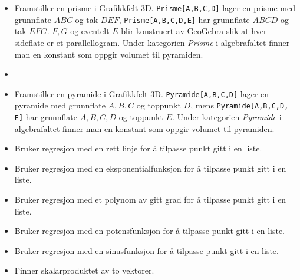 \begin{itemize}
\item {}
{Framstiller en prisme i Grafikkfelt 3D. {\tt Prisme[A,B,C,D]} lager en prisme med grunnflate $ ABC $ og tak $ DEF $, {\tt Prisme[A,B,C,D,E]} har grunnflate $ ABCD $ og tak $ EFG $. $ F, G$ og eventelt $ E $ blir konstruert av GeoGebra slik at hver sideflate er et parallellogram. Under kategorien \textsl{Prisme} i algebrafaltet finner man en konstant som oppgir volumet til pyramiden.}

\item {}

\item {}
{Framstiller en pyramide i Grafikkfelt 3D. {\tt Pyramide[A,B,C,D]} lager en pyramide med grunnflate ${ A, B, C} $ og toppunkt $ D $, mens {\tt Pyramide[A,B,C,D, E]} har grunnflate ${ A, B, C, D }$ og toppunkt $ E $. Under kategorien \textsl{Pyramide} i algebrafaltet finner man en konstant som oppgir volumet til pyramiden.}

\item {}
{Bruker regresjon med en rett linje for å tilpasse punkt gitt i en liste.}

\item {}
{Bruker regresjon med en eksponentialfunksjon for å tilpasse punkt gitt i en liste.}

\item {}
{Bruker regresjon med et polynom av gitt grad for å tilpasse punkt gitt i en liste.}

\item {}
{Bruker regresjon med en potensfunksjon for å tilpasse punkt gitt i en liste.}

\item {}
{Bruker regresjon med en sinusfunksjon for å tilpasse punkt gitt i en liste.	}

\item {} 
{Finner skalarproduktet av to vektorer. \\
}


\end{itemize}
